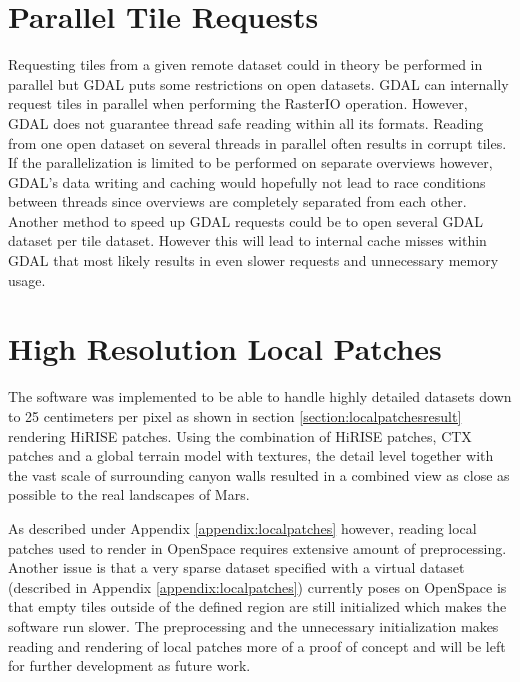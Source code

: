 \section{Parallel Tile Requests}
\label{section:parallelrequests}
Requesting tiles from a given remote dataset could in theory be performed in parallel but GDAL puts some restrictions on open datasets. GDAL can internally request tiles in parallel when performing the RasterIO operation. However, GDAL does not guarantee thread safe reading within all its formats. Reading from one open dataset on several threads in parallel often results in corrupt tiles. If the parallelization is limited to be performed on separate overviews however, GDAL's data writing and caching would hopefully not lead to race conditions between threads since overviews are completely separated from each other. Another method to speed up GDAL requests could be to open several GDAL dataset per tile dataset. However this will lead to internal cache misses within GDAL that most likely results in even slower requests and unnecessary memory usage.

\section{High Resolution Local Patches}
The software was implemented to be able to handle highly detailed datasets down to 25 centimeters per pixel as shown in section \ref{section:localpatchesresult} rendering HiRISE patches. Using the combination of HiRISE patches, CTX patches and a global terrain model with textures, the detail level together with the vast scale of surrounding canyon walls resulted in a combined view as close as possible to the real landscapes of Mars.

As described under Appendix \ref{appendix:localpatches} however, reading local patches used to render in OpenSpace requires extensive amount of preprocessing. Another issue is that a very sparse dataset specified with a virtual dataset (described in Appendix \ref{appendix:localpatches}) currently poses on OpenSpace is that empty tiles outside of the defined region are still initialized which makes the software run slower. The preprocessing and the unnecessary initialization makes reading and rendering of local patches more of a proof of concept and will be left for further development as future work.